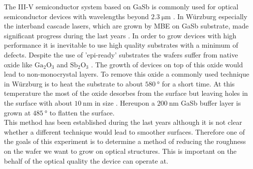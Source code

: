 The III-V semiconductor system based on GaSb is commonly used for optical 
semiconductor devices with wavelengths beyond $\SI{2.3}{\micro\meter}$ 
\cite{arafin}. In Würzburg especially the interband cascade lasers, which are 
grown by MBE on GaSb substrate, made significant progress during the last years 
\cite{weih}. In order to grow devices with high performance it is inevitable to 
use high quality substrates with a minimum of defects. Despite the use of 
'epi-ready' substrates the wafers suffer from native oxide like $\mathrm{Ga}_2 
\mathrm{O}_3$ and $\mathrm{Sb}_2 \mathrm{O}_3$ \cite{vineis}. The growth of 
devices on top of this oxide would lead to non-monocrystal layers. To remove 
this oxide a commonly used technique in Würzburg is to heat the substrate to 
about $\SI{580}{\degree}$ for a short time. At this temperature the most of the 
oxide desorbes from the surface but leaving holes in the surface with about  
$\SI{10}{\nano\meter}$ in size \cite{murray}. Hereupon a $\SI{200}{\nano\meter}$ 
GaSb buffer layer is grown at $\SI{485}{\degree}$ to flatten the surface. \\  
This method has been established during the last years although it is not clear 
whether a different technique would lead to smoother surfaces. Therefore one of 
the goals of this experiment is to determine a method of reducing the roughness 
on the wafer we want to grow on optical structures. This is important on the 
behalf of the optical quality the device can operate at.

